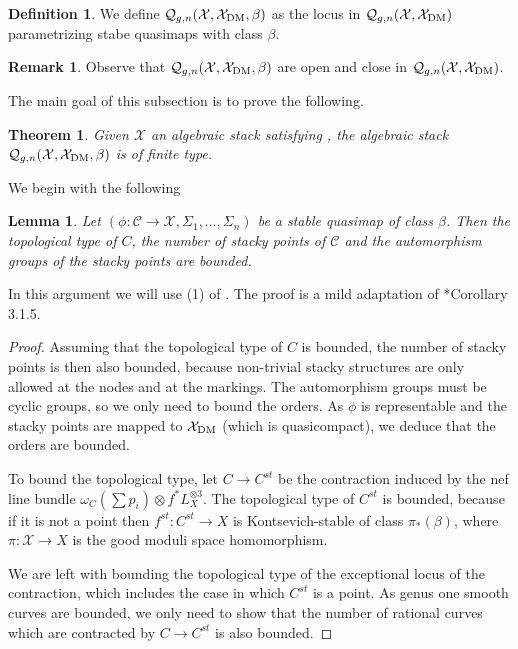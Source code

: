 \documentclass{amsart}
\newcommand{\sC}{\mathscr{C}}
\newcommand{\cQ}{\mathcal{Q}}
\newcommand{\cX}{\mathcal{X}}
\newcommand{\dm}{{\rm DM}}
\newtheorem{Teo}[theorem]{Theorem}
\newtheorem{Lemma}[theorem]{Lemma}
\theoremstyle{definition}
\newtheorem{Def}[theorem]{Definition}
\newtheorem{Remark}[theorem]{Remark}
\theoremstyle{definition}
\begin{document}
{    \begin{Def}
        We define  $\cQ_{g,n}(\cX,\cX_\dm,\beta)$ as the locus in  $\cQ_{g,n}(\cX,\cX_\dm)$ parametrizing stabe quasimaps with class $\beta$. 
    \end{Def}
    \begin{Remark}
        Observe that $\cQ_{g,n}(\cX,\cX_\dm,\beta)$ are open and close in $\cQ_{g,n}(\cX,\cX_\dm)$.
    \end{Remark}
    The main goal of this subsection is to prove the following.
    \begin{Teo}\label{thm_boundedness}
    Given $\cX$ an algebraic stack satisfying , the algebraic stack
        $\cQ_{g,n}(\cX,\cX_\dm,\beta)$ is of finite type.
    \end{Teo}
    We begin with the following

\begin{Lemma}\label{lemma:type is bounded}
        Let $(\phi:\sC\to \cX,\Sigma_1,\ldots,\Sigma_n)$ be a stable quasimap of class $\beta$. Then the topological type of $C$, the number of stacky points of $\sC$ and the automorphism groups of the stacky points are bounded.
\end{Lemma}
In this argument we will use (1) of . The proof is a mild adaptation of \cite{ciocan2010moduli}*{Corollary 3.1.5}.
\begin{proof}
    Assuming that the topological type of $C$ is bounded, the number of stacky points is then also bounded, because non-trivial stacky structures are only allowed at the nodes and at the markings. The automorphism groups must be cyclic groups, so we only need to bound the orders. As $\phi$ is representable and the stacky points are mapped to $\cX_\dm$ (which is quasicompact), we deduce that the orders are bounded.

    To bound the topological type, let $C\to C^{st}$ be the contraction induced by the nef line bundle $\omega_C(\sum p_i)\otimes f^*L_X^{\otimes 3}$. The topological type of $C^{st}$ is bounded, because if it is not a point then $f^{st}\colon C^{st}\to X$ is Kontsevich-stable of class $\pi_*(\beta)$, where $\pi\colon\cX\to X$ is the good moduli space homomorphism. 
    
    We are left with bounding the topological type of the exceptional locus of the contraction, which includes the case in which $C^{st}$ is a point. As genus one smooth curves are bounded, we only need to show that the number of rational curves which are contracted by $C\to C^{st}$ is also bounded.


\end{proof}}
\end{document}
